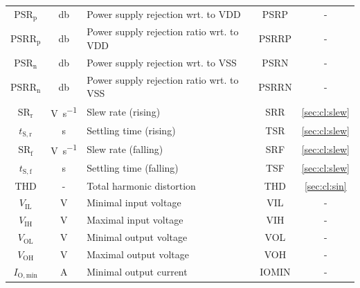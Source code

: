 \documentclass{article}[11pt]
\begin{document}
\begin{table}[H]
\begin{tabular}{cclcc}
$\mathrm{PSR}_{\mathrm{p}}$  & \si{\decibel}             & Power supply rejection wrt. to VDD        & PSRP                & -                  \\
$\mathrm{PSRR}_{\mathrm{p}}$ & \si{\decibel}             & Power supply rejection ratio wrt. to VDD  & PSRRP               & -                  \\
$\mathrm{PSR}_{\mathrm{n}}$  & \si{\decibel}             & Power supply rejection wrt. to VSS        & PSRN                & -                  \\
$\mathrm{PSRR}_{\mathrm{n}}$ & \si{\decibel}             & Power supply rejection ratio wrt. to VSS  & PSRRN               & -                  \\
$\mathrm{SR}_{\mathrm{r}}$   & \si{\volt\per\second}     & Slew rate (rising)                        & SRR                 & \ref{sec:cl:slew}  \\
$t_{\mathrm{S,r}}$           & \si{\second}              & Settling time (rising)                    & TSR                 & \ref{sec:cl:slew}  \\
$\mathrm{SR}_{\mathrm{f}}$   & \si{\volt\per\second}     & Slew rate (falling)                       & SRF                 & \ref{sec:cl:slew}  \\
$t_{\mathrm{S,f}}$           & \si{\second}              & Settling time (falling)                   & TSF                 & \ref{sec:cl:slew}  \\
$\mathrm{THD}$               & -                         & Total harmonic distortion                 & THD                 & \ref{sec:cl:sin}   \\
$V_{\mathrm{IL}}$            & \si{\volt}                & Minimal input voltage                     & VIL                 & -                  \\
$V_{\mathrm{IH}}$            & \si{\volt}                & Maximal input voltage                     & VIH                 & -                  \\
$V_{\mathrm{OL}}$            & \si{\volt}                & Minimal output voltage                    & VOL                 & -                  \\
$V_{\mathrm{OH}}$            & \si{\volt}                & Maximal output voltage                    & VOH                 & -                  \\
$I_{\mathrm{O,min}}$         & \si{\ampere}              & Minimal output current                    & IOMIN               & -                  \\

\end{tabular}
\end{table}
\end{document}
